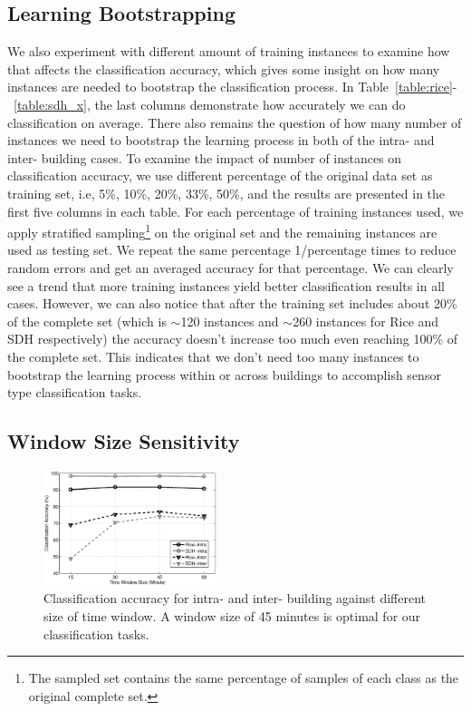 \subsection{Learning Bootstrapping}
We also experiment with different amount of training instances to examine how that affects the classification accuracy, which gives some insight on how many instances are needed 
to bootstrap the classification process. In Table~\ref{table:rice}-~\ref{table:sdh_x}, %
the last columns demonstrate how accurately we can do 
classification on average. There also remains the question of how many number of instances we need to bootstrap the learning process in both of the intra- and inter- building cases. 
To examine the impact of number of instances on classification accuracy, we use different percentage of the original data set as training set, i.e, 5\%, 10\%, 20\%, 33\%, 50\%, and the 
results are presented in the first five columns in each table. For each percentage of training instances used, we apply stratified sampling\footnote{The sampled set contains the same 
percentage of samples of each class as the original complete set.} on the original set and the remaining instances are used as testing set. We repeat the same percentage 1/percentage times 
to reduce random errors and get an averaged accuracy for that percentage. We can clearly see a trend that more training instances yield better classification results in all cases. 
However, we can also notice that after the training set includes about 20\% of the complete set (which is $\sim$120 instances and $\sim$260 instances for Rice and SDH respectively) the 
accuracy doesn't increase too much even reaching 100\% of the complete set. This indicates that we don't need too many instances to bootstrap the learning process within or across buildings 
to accomplish sensor type classification tasks.

\subsection{Window Size Sensitivity}
\begin{figure}[ht!]
\centering
	\includegraphics[width=0.45\textwidth]{./fig/window.eps}
\caption{Classification accuracy for intra- and inter- building against different size of time window. A window size of 45 minutes is optimal for our classification tasks.}
\label{fig:window}
\end{figure}

